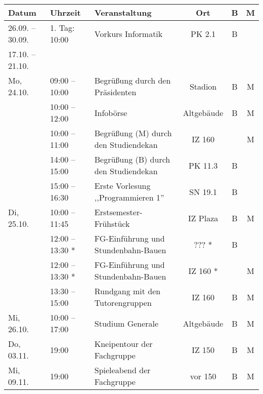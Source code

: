 \begin{tabular}{|l|l|p{6.7cm}|c|c|c|}
\hline \textbf{Datum} 		& \textbf{Uhrzeit} 	& \textbf{Veranstaltung}						& \textbf{Ort} 	& \textbf{B}	& \textbf{M} 	\\
\hline 26.09. – 30.09.		& 1. Tag: 10:00	 	& Vorkurs Informatik							& PK 2.1		& B				& 				\\
	   17.10. – 21.10.		& 					& 												& 				& 				&    			\\
\hline Mo, 24.10. 			& 09:00 – 10:00		& Begrüßung	durch den Präsidenten				& Stadion		& B				& M				\\ 
\hline 						& 10:00 – 12:00	 	& Infobörse										& Altgebäude	& B				& M				\\
\hline   					& 10:00 – 11:00	 	& Begrüßung (M) \newline durch den Studiendekan	& IZ 160		& 				& M				\\
\hline 						& 14:00 – 15:00	 	& Begrüßung (B) \newline durch den Studiendekan	& PK 11.3		& B				& 				\\
\hline 						& 15:00 – 16:30		& Erste Vorlesung ,,Programmieren 1''			& SN 19.1		& B 			&				\\
\hline Di, 25.10.			& 10:00 – 11:45 	& Erstsemester-Frühstück 						& IZ Plaza 		& B 			& M 			\\ 
\hline 						& 12:00 – 13:30 * 	& FG-Einführung und \newline Stundenbahn-Bauen 	& ??? * 		& B 			&  				\\%
\hline 						& 12:00 – 13:30 * 	& FG-Einführung und \newline Stundenbahn-Bauen 	& IZ 160 * 		& 				& M				\\
\hline 						& 13:30 – 15:00 	& Rundgang mit den  Tutorengruppen 				& IZ 160 		& B 			& M				\\
\hline Mi, 26.10.			& 10:00 – 17:00		& Studium Generale								& Altgebäude	& B				& M 			\\
\hline Do, 03.11. 			& 19:00 			& Kneipentour der Fachgruppe 					& IZ 150 		& B 			& M				\\
\hline Mi, 09.11.	 		& 19:00 			& Spieleabend der Fachgruppe 					& vor  150 		& B 			& M				\\
\hline
\end{tabular} 

